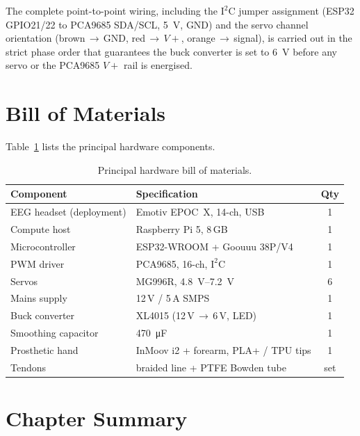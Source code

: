 The complete point-to-point wiring, including the
\(\text{I}^2\text{C}\) jumper assignment (ESP32 GPIO21/22 to PCA9685
SDA/SCL, \SI{5}{\volt}, GND) and the servo channel orientation
(brown\,$\to$\,GND, red\,$\to$\,\(V\!+\), orange\,$\to$\,signal), is
carried out in the strict phase order that guarantees the buck
converter is set to \SI{6}{\volt} before any servo or the PCA9685
\(V\!+\) rail is energised.

\section{Bill of Materials}
\label{sec:hw_bom}

Table~\ref{tab:hw_bom} lists the principal hardware components.

\begin{table}[htbp]
\centering
\caption{Principal hardware bill of materials.}
\label{tab:hw_bom}
\begin{tabular}{@{}llc@{}}
\toprule
\textbf{Component} & \textbf{Specification} & \textbf{Qty} \\
\midrule
EEG headset (deployment) & Emotiv EPOC~X, 14-ch, USB      & 1 \\
Compute host             & Raspberry Pi 5, 8\,GB          & 1 \\
Microcontroller          & ESP32-WROOM + Goouuu 38P/V4    & 1 \\
PWM driver               & PCA9685, 16-ch, $\text{I}^2\text{C}$ & 1 \\
Servos                   & MG996R, \SIrange{4.8}{7.2}{\volt} & 6 \\
Mains supply             & 12\,V / 5\,A SMPS              & 1 \\
Buck converter           & XL4015 (12\,V\,$\to$\,6\,V, LED) & 1 \\
Smoothing capacitor      & \SI{470}{\micro\farad}         & 1 \\
Prosthetic hand          & InMoov i2 + forearm, PLA+ / TPU tips & 1 \\
Tendons                  & braided line + PTFE Bowden tube & set \\
\bottomrule
\end{tabular}
\end{table}

\section{Chapter Summary}
\label{sec:hw_summary}

